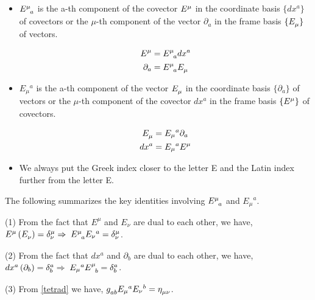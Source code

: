 \begin{tcolorbox}[
    colback=red!10,
    colframe=black!70,
    boxrule=0.5pt,
    arc=2mm
]
\begin{itemize}
    \item $ \tt{E }{ \mu}{a}$ is the a-th component of the covector $ \tt{E}{ \mu}{}$ in the coordinate basis $ \{ dx^a \}$ of covectors or the $ \mu$-th component of the vector $ \partial_a$ in the frame basis $ \{ \tt{E}{}{ \mu}\}$ of vectors. 
    
    \begin{align*}
        \tt{E}{ \mu}{} &= \tt{E}{ \mu}{a } dx^a \\
        \partial_a &=  \tt{E}{ \mu}{a} \tt{E}{ }{ \mu} \\
    \end{align*}

    \item $ E_ \mu {}^a$ is the a-th component of the vector $ \tt{E}{}{ \mu}$ in the coordinate basis $ \{ \partial_a \}$ of vectors or the $ \mu$-th component of the covector $ dx^a $ in the frame basis $ \{ \tt{E}{ \mu}{}\}$ of covectors. 
    
    \begin{align*}
        \tt{E}{}{ \mu} &= E_ \mu {}^a \partial_a  \\
         dx^a &=  E_ \mu {}^a \tt{E}{ \mu}{} \\
    \end{align*}

    \item We always put the Greek index closer to the letter E and the Latin index further from the letter E. 
\end{itemize}


\end{tcolorbox}



The following summarizes the key identities involving $ \tt{E}{ \mu}{a}$ and $ E_\mu{}^a$. 

(1) From the fact that $E^\mu$ and $E_\nu$ are dual to each other, we have, $\tt{E}{\mu}{}\lera{\tt{E}{}{\nu}} = \kron{\mu}{\nu} 
	\Rightarrow\;  \tt{E}{\mu}{a} \du{E}{\nu}{a} = \kron{\mu}{\nu}$. 

(2) From the fact that $dx^a$ and $\partial_b$ are dual to each other, we have, $ dx^a\lera{\partial_b} = \kron{a}{b} 
	\Rightarrow\;  \du{E}{\mu}{a} \tt{E}{\mu}{b} = \kron{a}{b}$.

(3) From \cref{tetrad} we have, $ \tt{g}{}{ab} E_\mu{}^a E_\nu{}^b = \tt{ \eta}{}{ \mu \nu}$. 

